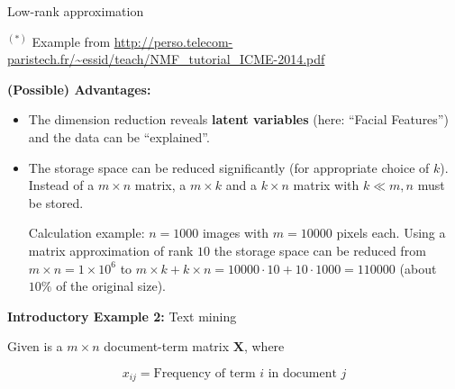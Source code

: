 \begin{vbframe}{Low-rank approximation}
\vfill
\begin{footnotesize}
$^{(*)}$ Example from \url{http://perso.telecom-paristech.fr/~essid/teach/NMF_tutorial_ICME-2014.pdf}
\end{footnotesize}

\framebreak

\textbf{(Possible) Advantages: }
\begin{itemize}
\item The dimension reduction reveals \textbf{latent variables} (here: \enquote{Facial Features}) and the data can be \enquote{explained}.
\item The storage space can be reduced significantly (for appropriate choice of $k$). Instead of a $m \times n$ matrix, a $m \times k$ and a $k \times n$ matrix with $k \ll m, n$ must be stored. \\
\begin{footnotesize}
\vspace*{0.2cm}
Calculation example: $n = 1000$ images with $m = 10000$ pixels each. Using a matrix approximation of rank $10$ the storage space can be reduced from $m \times n = 1 \times 10^6$ to $m \times k + k \times n = 10000 \cdot 10 + 10 \cdot 1000 = 110000$ (about $10\%$ of the original size).
\end{footnotesize}
\vspace*{0.2cm}
\end{itemize}




\framebreak

\textbf{Introductory Example 2:} Text mining

\lz

Given is a $m \times n$ document-term matrix $\mathbf{X}$, where

$$
x_{ij} = \text{Frequency of term $i$ in document $j$}
$$


\end{vbframe}
